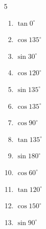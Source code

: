 \begin{multicols}{5}
\begin{enumerate}
  \item $\displaystyle \tan{0^\circ}$

        \phantom{$\displaystyle =0$}

  \item $\displaystyle \cos{135^\circ}$


  \item $\displaystyle \sin{30^\circ}$


  \item $\displaystyle \cos{120^\circ}$


  \item $\displaystyle \sin{135^\circ}$


  \item $\displaystyle \cos{135^\circ}$


  \item $\displaystyle \cos{90^\circ}$

        \phantom{$\displaystyle =0$}

  \item $\displaystyle \tan{135^\circ}$

        \phantom{$\displaystyle =-1$}

  \item $\displaystyle \sin{180^\circ}$

        \phantom{$\displaystyle =0$}

  \item $\displaystyle \cos{60^\circ}$


  \item $\displaystyle \tan{120^\circ}$


  \item $\displaystyle \cos{150^\circ}$


  \item $\displaystyle \sin{90^\circ}$


\end{enumerate}
\end{multicols}
